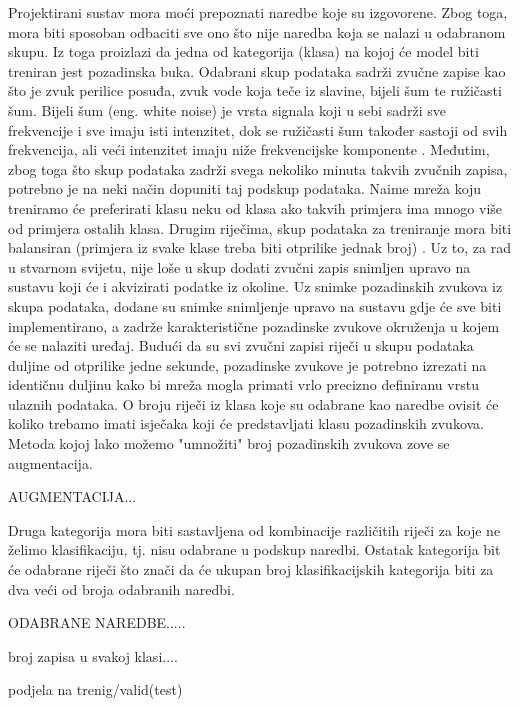 Projektirani sustav mora moći prepoznati naredbe koje su izgovorene.
Zbog toga, mora biti sposoban odbaciti sve ono što nije naredba koja se
nalazi u odabranom skupu. Iz toga proizlazi da jedna od kategorija (klasa)
na kojoj će model biti treniran jest pozadinska buka. Odabrani skup podataka
sadrži zvučne zapise kao što je zvuk perilice posuđa, zvuk vode koja teče
iz slavine, bijeli šum te ružičasti šum. Bijeli šum (eng. white noise) je vrsta
signala koji u sebi sadrži sve frekvencije i sve imaju isti intenzitet,
dok se ružičasti šum također sastoji od svih frekvencija, ali veći intenzitet
imaju niže frekvencijske komponente \cite{noise}. Međutim, zbog toga što skup
podataka zadrži
svega nekoliko minuta takvih zvučnih zapisa, potrebno je na neki način dopuniti
taj podskup podataka. Naime mreža koju treniramo će preferirati klasu neku od klasa
ako takvih primjera ima mnogo više od primjera ostalih klasa. Drugim riječima,
skup podataka za treniranje mora biti balansiran (primjera iz svake klase treba
biti otprilike jednak broj) \cite{balance}. Uz to, za rad u stvarnom svijetu, nije loše u skup
dodati zvučni zapis snimljen upravo na sustavu koji će i akvizirati podatke iz okoline.
Uz snimke pozadinskih zvukova iz skupa podataka, dodane su snimke snimljenje upravo
na sustavu gdje će sve biti implementirano, a zadrže karakteristične pozadinske
zvukove okruženja u kojem će se nalaziti uređaj. Budući da su svi zvučni zapisi 
riječi u skupu podataka duljine od otprilike jedne sekunde, pozadinske zvukove
je potrebno izrezati na identičnu duljinu kako bi mreža mogla primati vrlo 
precizno definiranu vrstu ulaznih podataka. O broju riječi iz klasa koje su odabrane 
kao naredbe ovisit će koliko trebamo imati isječaka koji će predstavljati
klasu pozadinskih zvukova. Metoda kojoj lako možemo "umnožiti" broj pozadinskih 
zvukova zove se augmentacija.

AUGMENTACIJA...

Druga kategorija mora biti sastavljena od kombinacije različitih riječi za koje
ne želimo klasifikaciju, tj. nisu odabrane u podskup naredbi. Ostatak
kategorija bit će odabrane riječi što znači da će ukupan broj klasifikacijskih
kategorija biti za dva veći od broja odabranih naredbi.

ODABRANE NAREDBE.....

broj zapisa u svakoj klasi....


podjela na trenig/valid(test)




